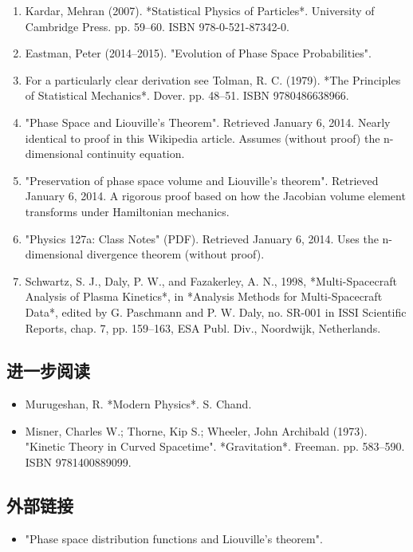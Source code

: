 \begin{enumerate}
\item Kardar, Mehran (2007). *Statistical Physics of Particles*. University of Cambridge Press. pp. 59–60. ISBN 978-0-521-87342-0.  
\item Eastman, Peter (2014–2015). "Evolution of Phase Space Probabilities".  
\item For a particularly clear derivation see Tolman, R. C. (1979). *The Principles of Statistical Mechanics*. Dover. pp. 48–51. ISBN 9780486638966.  
\item "Phase Space and Liouville's Theorem". Retrieved January 6, 2014. Nearly identical to proof in this Wikipedia article. Assumes (without proof) the n-dimensional continuity equation.  
\item "Preservation of phase space volume and Liouville's theorem". Retrieved January 6, 2014. A rigorous proof based on how the Jacobian volume element transforms under Hamiltonian mechanics.  
\item "Physics 127a: Class Notes" (PDF). Retrieved January 6, 2014. Uses the n-dimensional divergence theorem (without proof).  
\item Schwartz, S. J., Daly, P. W., and Fazakerley, A. N., 1998, *Multi-Spacecraft Analysis of Plasma Kinetics*, in *Analysis Methods for Multi-Spacecraft Data*, edited by G. Paschmann and P. W. Daly, no. SR-001 in ISSI Scientific Reports, chap. 7, pp. 159–163, ESA Publ. Div., Noordwijk, Netherlands.  
\end{enumerate}
\subsection{进一步阅读}  
\begin{itemize}
\item Murugeshan, R. *Modern Physics*. S. Chand.  
\item Misner, Charles W.; Thorne, Kip S.; Wheeler, John Archibald (1973). "Kinetic Theory in Curved Spacetime". *Gravitation*. Freeman. pp. 583–590. ISBN 9781400889099. 
\end{itemize} 
\subsection{外部链接}  
\begin{itemize}
\item "Phase space distribution functions and Liouville's theorem".
\end{itemize}